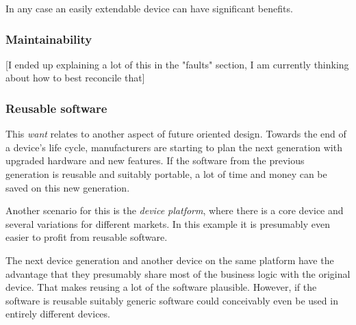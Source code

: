 In any case an easily extendable device can have significant benefits.
\subsubsection{Maintainability}
[I ended up explaining a lot of this in the "faults" section, I am currently thinking about how to best reconcile that]
\subsubsection{Reusable software}
This \textit{want} relates to another aspect of future oriented design. Towards the end of a device's life cycle, manufacturers are starting to plan the next generation with upgraded hardware and new features. If the software from the previous generation is reusable and suitably portable, a lot of time and money can be saved on this new generation.

Another scenario for this is the \textit{device platform}, where there is a core device and several variations for different markets. In this example it is presumably even easier to profit from reusable software.

The next device generation and another device on the same platform have the advantage that they presumably share most of the business logic with the original device. That makes reusing a lot of the software plausible. However, if the software is reusable suitably generic software could conceivably even be used in entirely different devices.

